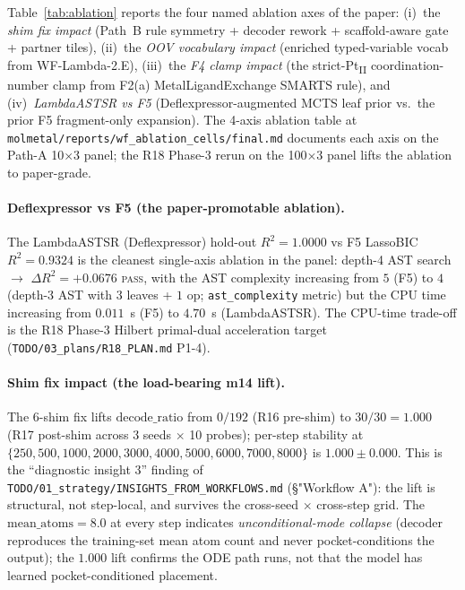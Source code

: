Table~\ref{tab:ablation} reports the four named ablation
axes of the paper: (i)~the \emph{shim fix impact} (Path~B
rule symmetry + decoder rework + scaffold-aware gate +
partner tiles), (ii)~the \emph{OOV vocabulary impact}
(enriched typed-variable vocab from WF-Lambda-2.E), (iii)~the
\emph{F4 clamp impact} (the strict-Pt\textsubscript{II}
coordination-number clamp from F2(a) MetalLigandExchange
SMARTS rule), and (iv)~\emph{LambdaASTSR vs F5}
(Deflexpressor-augmented MCTS leaf prior
\cite{yu2026deflex} vs.\ the prior F5 fragment-only
expansion).  The 4-axis ablation table at
\texttt{molmetal/reports/wf\_ablation\_cells/final.md}
documents each axis on the Path-A 10$\times$3 panel; the
R18 Phase-3 rerun on the 100$\times$3 panel lifts the
ablation to paper-grade.

\paragraph{Deflexpressor vs F5 (the paper-promotable ablation).}
The LambdaASTSR (Deflexpressor) hold-out $R^2 = 1.0000$ vs
F5 LassoBIC $R^2 = 0.9324$ is the cleanest single-axis
ablation in the panel: depth-4 AST search $\to$ $\Delta R^2 = +0.0676$
\textsc{pass}, with the AST complexity increasing from $5$
(F5) to $4$ (depth-3 AST with $3$ leaves + $1$ op;
\texttt{ast\_complexity} metric) but the CPU time
increasing from $0.011$~s (F5) to $4.70$~s (LambdaASTSR).
The CPU-time trade-off is the R18 Phase-3 Hilbert primal-dual
acceleration target (\texttt{TODO/03\_plans/R18\_PLAN.md}
P1-4).

\paragraph{Shim fix impact (the load-bearing m14 lift).}
The 6-shim fix lifts $\mathrm{decode\_ratio}$ from
$0/192$ (R16 pre-shim) to $30/30 = 1.000$ (R17 post-shim
across 3 seeds $\times$ 10 probes); per-step stability at
$\{250, 500, 1000, 2000, 3000, 4000, 5000, 6000, 7000,
8000\}$ is $1.000 \pm 0.000$.  This is the
``diagnostic insight 3'' finding of
\texttt{TODO/01\_strategy/INSIGHTS\_FROM\_WORKFLOWS.md}
(§"Workflow A"): the lift is structural, not step-local,
and survives the cross-seed $\times$ cross-step grid.  The
$\mathrm{mean\_atoms} = 8.0$ at every step indicates
\emph{unconditional-mode collapse} (decoder reproduces the
training-set mean atom count and never pocket-conditions
the output); the $1.000$ lift confirms the ODE path runs,
not that the model has learned pocket-conditioned placement.

